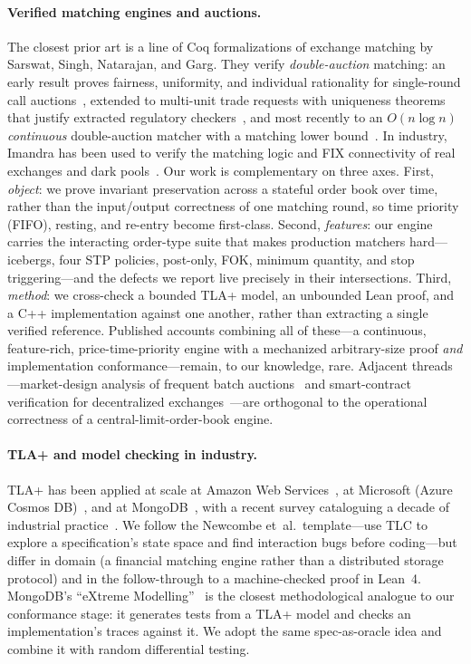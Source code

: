 \documentclass[11pt,a4paper]{article}
\begin{document}
\paragraph{Verified matching engines and auctions.}
The closest prior art is a line of Coq formalizations of exchange
matching by Sarswat, Singh, Natarajan, and Garg. They verify
\emph{double-auction} matching: an early result proves fairness,
uniformity, and individual rationality for single-round call
auctions~\cite{Sarswat2020}, extended to multi-unit trade requests with
uniqueness theorems that justify extracted regulatory
checkers~\cite{Natarajan2021,Garg2025}, and most recently to an
$O(n\log n)$ \emph{continuous} double-auction matcher with a matching
lower bound~\cite{Garg2024}. In industry, Imandra has been used to
verify the matching logic and FIX connectivity of real exchanges and
dark pools~\cite{Passmore2017,Imandra2020,Passmore2021}. Our work is
complementary on three axes. First, \emph{object}: we prove invariant
preservation across a stateful order book over time, rather than the
input/output correctness of one matching round, so time priority
(FIFO), resting, and re-entry become first-class. Second,
\emph{features}: our engine carries the interacting order-type suite
that makes production matchers hard---icebergs, four STP policies,
post-only, FOK, minimum quantity, and stop triggering---and the defects
we report live precisely in their intersections. Third, \emph{method}:
we cross-check a bounded TLA+ model, an unbounded Lean proof, and a C++
implementation against one another, rather than extracting a single
verified reference. Published accounts combining all of these---a
continuous, feature-rich, price-time-priority engine with a mechanized
arbitrary-size proof \emph{and} implementation conformance---remain, to
our knowledge, rare. Adjacent threads---market-design analysis of
frequent batch auctions~\cite{Budish2015} and smart-contract
verification for decentralized exchanges~\cite{Bhargavan2016,%
Grishchenko2018}---are orthogonal to the operational correctness of a
central-limit-order-book engine.

\paragraph{TLA+ and model checking in industry.}
TLA+ has been applied at scale at Amazon Web
Services~\cite{Newcombe2015,Newcombe2014}, at Microsoft (Azure Cosmos
DB)~\cite{Hackett2023}, and at MongoDB~\cite{Davis2020}, with a recent
survey cataloguing a decade of industrial practice~\cite{Bogli2024}. We
follow the Newcombe et~al.\ template---use TLC to explore a
specification's state space and find interaction bugs before
coding---but differ in domain (a financial matching engine rather than a
distributed storage protocol) and in the follow-through to a
machine-checked proof in Lean~4. MongoDB's ``eXtreme
Modelling''~\cite{Davis2020} is the closest methodological analogue to
our conformance stage: it generates tests from a TLA+ model and checks
an implementation's traces against it. We adopt the same spec-as-oracle
idea and combine it with random differential testing.
\end{document}
